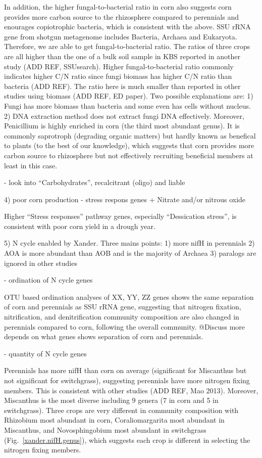 \documentclass[12pt]{article}
\begin{document}
{In addition, the higher fungal-to-bacterial ratio in corn also suggests corn provides more carbon source to the rhizosphere compared to perennials and enourages copiotrophic bacteria, which is consistent with the above. SSU rRNA gene from shotgun metagenome includes Bacteria, Archaea and Eukaryota. Therefore, we are able to get fungal-to-bacterial ratio. The ratios of three crops are all higher than the one of a bulk soil sample in KBS reported in another study (ADD REF, SSUsearch). Higher fungal-to-bacterial ratio commonly indicates higher C/N ratio since fungi biomass has higher C/N ratio than bacteria (ADD REF). The ratio here is much smaller than reported in other studies using biomass (ADD REF, ED paper). Two possible explanations are: 1) Fungi has more biomass than bacteria and some even has cells without nucleus. 2) DNA extraction method does not extract fungi DNA effectively. Moreover, Penicillium is highly enriched in corn (the third most abundant genus). It is commonly saprotroph (degrading organic matters) but hardly known as benefical to plants (to the best of our knowledge), which suggests that corn provides more carbon source to rhizosphere but not effectively recruiting beneficial members at least in this case.

- look into ``Carbohydrates'', recalcitrant (oligo) and liable

4) poor corn production - stress respons genes + Nitrate and/or nitrous oxide

Higher ``Stress responses'' pathway genes, especially ``Dessication stress'', is consistent with poor corn yield in a drough year.

5) N cycle enabled by Xander. Three mains points: 1) more nifH in perennials 2) AOA is more abundant than AOB and is the majority of Archaea 3) paralogs are ignored in other studies

- ordination of N cycle genes

OTU based ordination analyses of XX, YY, ZZ genes shows the same separation of corn and perennials as SSU rRNA gene, suggesting that nitrogen fixation, nitrification, and denitrification community composition are also changed in perennials compared to corn, following the overall community. @Discuss more depends on what genes shows separation of corn and perennials.

- quantity of N cycle genes

Perennials has more nifH than corn on average (significant for Miscanthus but not significant for switchgrass), suggesting perennials have more nitrogen fixing members. This is consistent with other studies (ADD REF, Mao 2013). Moreover, Miscanthus is the most diverse including 9 genera (7 in corn and 5 in switchgrass). Three crops are very different in community composition with Rhizobium most abundant in corn, Coraliomargarita most abundant in Miscanthus, and Novosphingobium most abundant in switchgrass (Fig.~\ref{xander.nifH.genus}), which suggests each crop is different in selecting the nitrogen fixing members.

}
\end{document}
